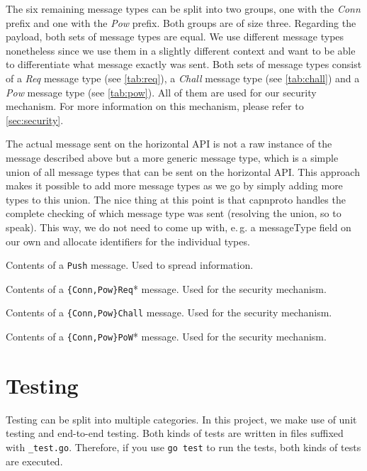\documentclass[a4paper,english,10pt,NET]{tumarticle}
\renewcommand{\eg}{\mbox{e.\,g.}\xspace} %
\begin{document}
The six remaining message types can be split into two groups, one with the \emph{Conn} prefix and one with the \emph{Pow} prefix.
Both groups are of size three.
Regarding the payload, both sets of message types are equal.
We use different message types nonetheless since we use them in a slightly different context and want to be able to differentiate what message exactly was sent.
Both sets of message types consist of
a \emph{Req} message type (see \cref{tab:req}),
a \emph{Chall} message type (see \cref{tab:chall}) and
a \emph{Pow} message type (see \cref{tab:pow}).
All of them are used for our security mechanism.
For more information on this mechanism, please refer to \cref{sec:security}.

The actual message sent on the horizontal API is not a raw instance of the message described above but a more generic message type, which is a simple union of all message types that can be sent on the horizontal API.
This approach makes it possible to add more message types as we go by simply adding more types to this union.
The nice thing at this point is that capnproto handles the complete checking of which message type was sent (resolving the union, so to speak).
This way, we do not need to come up with, \eg a messageType field on our own and allocate identifiers for the individual types.

\begin{table}
	\centering
	
	\caption{
		Contents of a \texttt{Push} message.
		Used to spread information.
	}
	\label{tab:push}
\end{table}

\begin{table}
	\centering
	
	\caption{
		Contents of a \texttt{\{Conn,Pow\}Req}* message.
		Used for the security mechanism.
	}
	\label{tab:req}
\end{table}

\begin{table}
	\centering
	
	\caption{
		Contents of a \texttt{\{Conn,Pow\}Chall} message.
		Used for the security mechanism.
	}
	\label{tab:chall}
\end{table}

\begin{table}
	\centering
	
	\caption{
		Contents of a \texttt{\{Conn,Pow\}PoW}* message.
		Used for the security mechanism.
	}
	\label{tab:pow}
\end{table}

\section{Testing} \label{sec:testing}
Testing can be split into multiple categories.
In this project, we make use of unit testing and end-to-end testing.
Both kinds of tests are written in files suffixed with \texttt{\_test.go}.
Therefore, if you use \lstinline{go test} to run the tests, both kinds of tests are executed.
\end{document}
